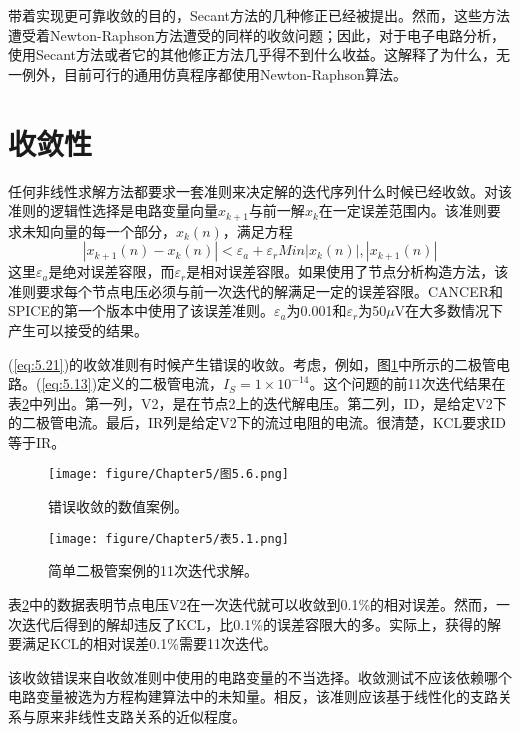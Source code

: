 带着实现更可靠收敛的目的，Secant方法的几种修正已经被提出\cite{ref-57}。然而，这些方法遭受着Newton-Raphson方法遭受的同样的收敛问题；因此，对于电子电路分析，使用Secant方法或者它的其他修正方法几乎得不到什么收益。这解释了为什么，无一例外，目前可行的通用仿真程序都使用Newton-Raphson算法。

\section{收敛性}
任何非线性求解方法都要求一套准则来决定解的迭代序列什么时候已经收敛。对该准则的逻辑性选择是电路变量向量$x_{k+1}$与前一解$x_k$在一定误差范围内。该准则要求未知向量的每一个部分，$x_k(n)$，满足方程
\begin{equation}
    |x_{k+1}(n)-x_k(n)| < \varepsilon_a + \varepsilon_r Min{|x_k(n)|,|x_{k+1}(n)|}
    \label{eq:5.21}
\end{equation}
这里$\varepsilon_a$是绝对误差容限，而$\varepsilon_r$是相对误差容限。如果使用了节点分析构造方法，该准则要求每个节点电压必须与前一次迭代的解满足一定的误差容限。CANCER和SPICE的第一个版本中使用了该误差准则。$\varepsilon_a$为0.001和$\varepsilon_r$为50$\mu$V在大多数情况下产生可以接受的结果。

(\ref{eq:5.21})的收敛准则有时候产生错误的收敛。考虑，例如，图\ref{图5.6}中所示的二极管电路。(\ref{eq:5.13})定义的二极管电流，$I_S = 1 \times 10^{-14}$。这个问题的前11次迭代结果在表\ref{表5.1}中列出。第一列，V2，是在节点2上的迭代解电压。第二列，ID，是给定V2下的二极管电流。最后，IR列是给定V2下的流过电阻的电流。很清楚，KCL要求ID等于IR。
\begin{figure}[htbp]
\small
    \centering
    \texttt{[image: figure/Chapter5/图5.6.png]}
    \caption{错误收敛的数值案例。}
    \label{图5.6}
\end{figure}

\begin{figure}[htbp]
\small
    \centering
    \texttt{[image: figure/Chapter5/表5.1.png]}
    \caption{简单二极管案例的11次迭代求解。}
    \label{表5.1}
\end{figure}

表\ref{表5.1}中的数据表明节点电压V2在一次迭代就可以收敛到0.1\%的相对误差。然而，一次迭代后得到的解却违反了KCL，比0.1\%的误差容限大的多。实际上，获得的解要满足KCL的相对误差0.1\%需要11次迭代。

该收敛错误来自收敛准则中使用的电路变量的不当选择。收敛测试不应该依赖哪个电路变量被选为方程构建算法中的未知量。相反，该准则应该基于线性化的支路关系与原来非线性支路关系的近似程度。

